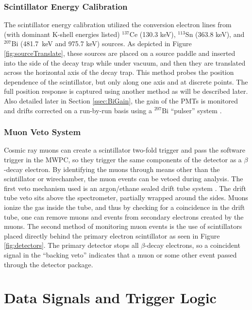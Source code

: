\subsubsection{Scintillator Energy Calibration} \label{sssec:scintEnCal}

The scintillator energy calibration utilized the conversion electron lines from
(with dominant K-shell energies listed) $^{137}\mathrm{Ce}$
(130.3 keV), $^{113}\mathrm{Sn}$ (363.8 keV), and $^{207}\mathrm{Bi}$ (481.7~keV and 975.7 keV)
sources. As depicted in Figure \ref{fig:sourceTranslate},
these sources are placed on a source paddle and inserted into the side of the
decay trap while under vacuum, and then they are translated across the horizontal axis of the decay
trap. This method probes the position dependence of the scintillator, but only along one axis and
at discrete points. The full position response is captured using another method as will be
described later. Also detailed later in Section \ref{ssec:BiGain}, the gain of the PMTs is monitored
and drifts corrected 
on a run-by-run basis using a $^{207}\mathrm{Bi}$ ``pulser'' system \cite{morris1976stable}.

\subsubsection{Muon Veto System}

Cosmic ray muons can create a scintillator two-fold trigger and pass the software trigger in
the MWPC, so they trigger the same components of the detector as a $\beta$-decay electron. By identifying
the muons through means other than the scintillator or wirechamber, the muon events
can be vetoed during analysis. The first veto mechanism used
is an argon/ethane sealed drift tube system \cite{rios2011sealed}. The drift tube veto sits
above the spectrometer, partially wrapped around the sides. Muons ionize the gas inside the
tube, and thus by checking for a coincidence in the drift tube, one can remove muons
and events from secondary electrons created by the muons. The second method of monitoring
muon events is the use of scintillators placed directly behind the primary
electron scintillator as seen in Figure \ref{fig:detectors}. The primary detector
stops all $\beta$-decay electrons, so a coincident signal in the ``backing veto''
indicates that a muon or some other event passed through the detector package.

\section{Data Signals and Trigger Logic}

